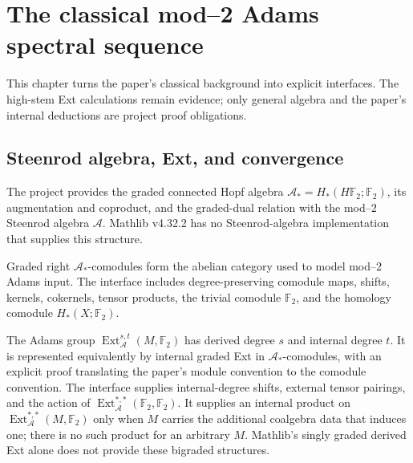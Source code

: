 \chapter{The classical mod--2 Adams spectral sequence}
\label{chap:classical-adams}

This chapter turns the paper's classical background into explicit interfaces.
The high-stem Ext calculations remain evidence; only general algebra and the
paper's internal deductions are project proof obligations.

\section{Steenrod algebra, Ext, and convergence}

\begin{definition}
  \label{def:dual-steenrod-algebra}
  \notready
  The project provides the graded connected Hopf algebra
  $\mathcal A_*=H_*(H\mathbb F_2;\mathbb F_2)$, its augmentation and coproduct,
  and the graded-dual relation with the mod--$2$ Steenrod algebra $\mathcal A$.
  Mathlib v4.32.2 has no Steenrod-algebra implementation that supplies this
  structure.
\end{definition}

\begin{definition}
  \label{def:steenrod-comodule-category}
  \notready
  Graded right $\mathcal A_*$-comodules form the abelian category used to model
  mod--$2$ Adams input.  The interface includes degree-preserving comodule
  maps, shifts, kernels, cokernels, tensor products, the trivial comodule
  $\mathbb F_2$, and the homology comodule $H_*(X;\mathbb F_2)$.
\end{definition}

\begin{definition}
  \label{def:adams-bigraded-ext}
  \notready
  The Adams group $\operatorname{Ext}_{\mathcal A}^{s,t}(M,\mathbb F_2)$ has
  derived degree $s$ and internal degree $t$.  It is represented equivalently
  by internal graded Ext in $\mathcal A_*$-comodules, with an explicit proof
  translating the paper's module convention to the comodule convention.  The
  interface supplies internal-degree shifts, external tensor pairings, and the
  action of
  $\operatorname{Ext}_{\mathcal A}^{*,*}(\mathbb F_2,\mathbb F_2)$.
  It supplies an internal product on
  $\operatorname{Ext}_{\mathcal A}^{*,*}(M,\mathbb F_2)$ only when $M$ carries
  the additional coalgebra data that induces one; there is no such product for
  an arbitrary $M$.  Mathlib's singly graded derived Ext alone does not provide
  these bigraded structures.
\end{definition}

